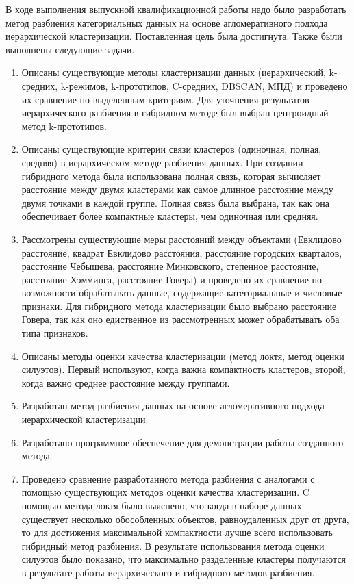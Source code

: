 \conclusion

В ходе выполнения выпускной квалификационной работы надо было разработать метод разбиения категориальных данных на основе агломеративного подхода иерархической кластеризации. Поставленная цель была достигнута. Также были выполнены следующие задачи.
\begin{enumerate}
    \item Описаны существующие методы кластеризации данных (иерархический, k-средних, k-режимов, k-прототипов, C-средних, DBSCAN, МПД) и проведено их сравнение по выделенным критериям. Для уточнения результатов иерархического разбиения в гибридном методе был выбран центроидный метод k-прототипов.
    \item Описаны существующие критерии связи кластеров (одиночная, полная, средняя) в иерархическом методе разбиения данных. При создании гибридного метода была использована полная связь, которая вычисляет расстояние между двумя кластерами как самое длинное расстояние между двумя точками в каждой группе. Полная связь была выбрана, так как она обеспечивает более компактные кластеры, чем одиночная или средняя.
    \item Рассмотрены существующие меры расстояний между объектами (Евклидово расстояние, квадрат Евклидово расстояния, расстояние городских кварталов, расстояние Чебышева, расстояние Минковского, степенное расстояние, расстояние Хэмминга, расстояние Говера) и проведено их сравнение по возможности обрабатывать данные, содержащие категориальные и числовые признаки. Для гибридного метода кластеризации было выбрано расстояние Говера, так как оно едиственное из рассмотренных может обрабатывать оба типа признаков.
    \item Описаны методы оценки качества кластеризации (метод локтя, метод оценки силуэтов). Первый используют, когда важна компактность кластеров, второй, когда важно среднее расстояние между группами.
    \item Разработан метод разбиения данных на основе агломеративного подхода иерархической кластеризации.
    \item Разработано программное обеспечение для демонстрации работы созданного метода.
    \item Проведено сравнение разработанного метода разбиения с аналогами с помощью существующих методов оценки качества кластеризации. C помощью метода локтя было выяснено, что когда в наборе данных существует несколько обособленных объектов, равноудаленных друг от друга, то для достижения максимальной компактности лучше всего использовать гибридный метод разбиения. В результате использования метода оценки силуэтов было показано, что максимально разделенные кластеры получаются в результате работы иерархического и гибридного методов разбиения.
\end{enumerate}
